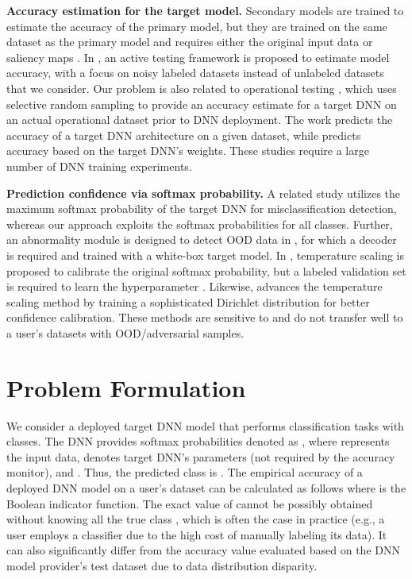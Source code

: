 \documentclass{article}
\begin{document}
\textbf{Accuracy estimation for the target model.}
Secondary models are trained to estimate the accuracy of the primary model, but
they are trained on the same dataset as the primary model and requires 
either the
original input data \cite{mpp_2019} or saliency maps \cite{DNN_AccuracyPrediction_SaliencyMaps_Failures_AutonomousDriving_ZhangyangWang_TAMU_ICML_Workshop_2019_mohseni2019predicting}.
 In \cite{active_testing_accuacy_2018},  an active testing framework is
 proposed to estimate model accuracy,
  with a focus on
  noisy labeled datasets instead of
  unlabeled datasets
 that we consider.
Our problem is also related to operational testing \cite{DNN_Operational_Testing_NJU_FSE_2019_10.1145/3338906.3338930},
which uses selective random sampling
to provide an accuracy estimate for a target
DNN on an actual operational dataset prior to DNN deployment.
The work \cite{DNN_AccuracyPrediction_TAPAS_Architecture_Accuracy_Predictor_AAAI_2019_istrate2019tapas}
predicts the accuracy of a target DNN architecture on
a given dataset, while \cite{DNN_AccuracyPrediction_Weights_GoogleBrain_2020_unterthiner2020predicting}
predicts accuracy based on the target DNN's weights.
These studies
require a large number of DNN training experiments.

\textbf{Prediction confidence via softmax probability.}
A related study
\cite{DNN_Uncertainty_Baseline_OOD_ICLR_2017}
utilizes the maximum softmax probability of the target DNN for misclassification detection, whereas our approach exploits  the softmax probabilities for all classes.
Further, an abnormality module is designed to detect OOD data in \cite{DNN_Uncertainty_Baseline_OOD_ICLR_2017},
for which a decoder is required and trained with a white-box target model.
In \cite{DNN_Calibration_TemperatureScaling_ICML_2017_calibration_guo_2017}, {temperature scaling} is proposed to calibrate the original softmax probability,
but a labeled validation set is required to learn the hyperparameter .
Likewise, \cite{DNN_Uncertainty_PostHoc_Dirichlet_NIPS_2019_kull2019beyond}
advances the temperature scaling method by training
a sophisticated Dirichlet distribution for better confidence calibration.
These methods are sensitive to and do not transfer
well to a user's datasets with OOD/adversarial samples. \section{Problem Formulation}
We consider a deployed target DNN model that performs classification tasks
with  classes. The DNN provides softmax probabilities
denoted as , where  represents the input data,  denotes target DNN's parameters  (not required by the accuracy monitor),  and . Thus, the
predicted class is  . 
The empirical accuracy  of a deployed DNN model  on a user's dataset  can be calculated as follows 
where  is the Boolean indicator function.
The exact value of  cannot be possibly obtained without
knowing all the true class , which is often the case in practice
(e.g., a user employs a classifier due to the high cost of manually
labeling its data). It can also significantly
differ from the accuracy value evaluated based on
the DNN model provider's test dataset due to data
distribution disparity.
\end{document}
